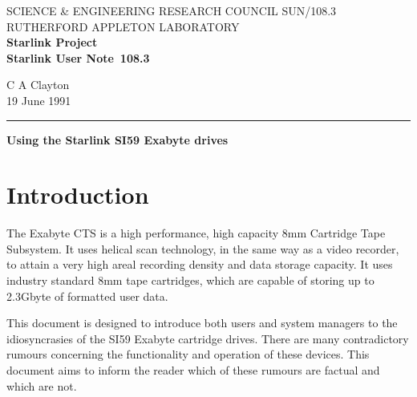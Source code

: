 \pagestyle{myheadings}

\newcommand{\stardoccategory}  {Starlink User Note}
\newcommand{\stardocinitials}  {SUN}
\newcommand{\stardocnumber}    {108.3}
\newcommand{\stardocauthors}   {C A Clayton}
\newcommand{\stardocdate}      {19 June 1991}
\newcommand{\stardoctitle}     {Using the Starlink SI59 Exabyte drives}

\newcommand{\stardocname}{\stardocinitials /\stardocnumber}
\markright{\stardocname}
\setlength{\textwidth}{160mm}
\setlength{\textheight}{240mm}
\setlength{\topmargin}{-5mm}
\setlength{\oddsidemargin}{0mm}
\setlength{\evensidemargin}{0mm}
\setlength{\parindent}{0mm}
\setlength{\parskip}{\medskipamount}
\setlength{\unitlength}{1mm}


\thispagestyle{empty}
SCIENCE \& ENGINEERING RESEARCH COUNCIL \hfill \stardocname\\
RUTHERFORD APPLETON LABORATORY\\
{\large\bf Starlink Project\\}
{\large\bf \stardoccategory\ \stardocnumber}
\begin{flushright}
\stardocauthors\\
\stardocdate
\end{flushright}
\vspace{-4mm}
\rule{\textwidth}{0.5mm}
\vspace{5mm}
\begin{center}
{\Large\bf \stardoctitle}
\end{center}
\vspace{5mm}

\section{Introduction}

The Exabyte CTS is a high performance, high capacity 8mm Cartridge Tape
Subsystem. It uses helical scan technology, in the same way as a video
recorder,
to attain a very high areal recording density and data storage capacity.
It uses industry standard 8mm tape cartridges, which are capable of storing
up to 2.3Gbyte of formatted user data.

This document is designed to introduce both users and system managers
to the idiosyncrasies of the SI59 Exabyte cartridge drives. There are
many contradictory rumours concerning the functionality and operation
of these devices. This document aims to inform the reader which of these
rumours are factual and which are not.

